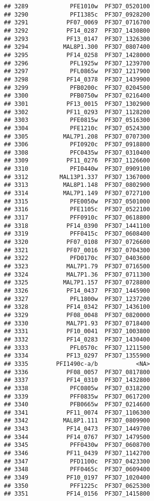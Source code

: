 \documentclass{article}\usepackage[]{graphicx}\usepackage[]{color}
\makeatletter
\newenvironment{kframe}{%
 \def\at@end@of@kframe{}%
 \ifinner\ifhmode%
  \def\at@end@of@kframe{\end{minipage}}%
  \begin{minipage}{\columnwidth}%
 \fi\fi%
 \def\FrameCommand##1{\hskip\@totalleftmargin \hskip-\fboxsep
 \colorbox{shadecolor}{##1}\hskip-\fboxsep
     \hskip-\linewidth \hskip-\@totalleftmargin \hskip\columnwidth}%
 \MakeFramed {\advance\hsize-\width
   \@totalleftmargin\z@ \linewidth\hsize
   \@setminipage}}%
 {\par\unskip\endMakeFramed%
 \at@end@of@kframe}
\newenvironment{knitrout}{}{} %
\makeatother
\begin{document}
\begin{knitrout}
\begin{kframe}
\begin{verbatim}
## 3289            PFE1010w  PF3D7_0520100
## 3290            PFI1385c  PF3D7_0928200
## 3291           PF07_0069  PF3D7_0716700
## 3292           PF14_0287  PF3D7_1430800
## 3293           PF13_0147  PF3D7_1326300
## 3294          MAL8P1.300  PF3D7_0807400
## 3295           PF14_0258  PF3D7_1428000
## 3296            PFL1925w  PF3D7_1239700
## 3297            PFL0865w  PF3D7_1217900
## 3298           PF14_0378  PF3D7_1439900
## 3299            PFB0200c  PF3D7_0204500
## 3300            PFB0750w  PF3D7_0216400
## 3301           PF13_0015  PF3D7_1302900
## 3302           PF11_0293  PF3D7_1128200
## 3303            PFE0815w  PF3D7_0516300
## 3304            PFE1210c  PF3D7_0524300
## 3305          MAL7P1.208  PF3D7_0707300
## 3306            PFI0920c  PF3D7_0918800
## 3308            PFC0435w  PF3D7_0310400
## 3309           PF11_0276  PF3D7_1126600
## 3310            PFI0440w  PF3D7_0909100
## 3312         MAL13P1.337  PF3D7_1367000
## 3313          MAL8P1.148  PF3D7_0802900
## 3314          MAL7P1.149  PF3D7_0727100
## 3315            PFE0050w  PF3D7_0501000
## 3316            PFE1105c  PF3D7_0522100
## 3317            PFF0910c  PF3D7_0618800
## 3318           PF14_0390  PF3D7_1441100
## 3319            PFF0415c  PF3D7_0608400
## 3320           PF07_0108  PF3D7_0726600
## 3321           PF07_0016  PF3D7_0704300
## 3322            PFD0170c  PF3D7_0403600
## 3323           MAL7P1.79  PF3D7_0716500
## 3324           MAL7P1.36  PF3D7_0711300
## 3325          MAL7P1.157  PF3D7_0728800
## 3326           PF14_0437  PF3D7_1445900
## 3327            PFL1800w  PF3D7_1237200
## 3328           PF14_0342  PF3D7_1436100
## 3329           PF08_0048  PF3D7_0820000
## 3330           MAL7P1.93  PF3D7_0718400
## 3331           PF10_0041  PF3D7_1003800
## 3332           PF14_0283  PF3D7_1430400
## 3333            PFL0570c  PF3D7_1211500
## 3334           PF13_0297  PF3D7_1355900
## 3335        PFI1490c-a/b           <NA>
## 3336           PF08_0057  PF3D7_0817800
## 3337           PF14_0310  PF3D7_1432800
## 3338            PFC0805w  PF3D7_0318200
## 3339            PFF0835w  PF3D7_0617200
## 3340            PFB0665w  PF3D7_0214600
## 3341           PF11_0074  PF3D7_1106300
## 3342          MAL8P1.111  PF3D7_0809900
## 3343           PF14_0473  PF3D7_1449700
## 3344           PF14_0767  PF3D7_1479500
## 3345            PFF0430w  PF3D7_0608700
## 3346           PF11_0439  PF3D7_1142700
## 3347            PFD1100c  PF3D7_0423300
## 3348            PFF0465c  PF3D7_0609400
## 3349           PF10_0197  PF3D7_1020400
## 3350            PFF1225c  PF3D7_0625300
## 3351           PF14_0156  PF3D7_1415800

\end{verbatim}
\end{kframe}
\end{knitrout}
\end{document}
